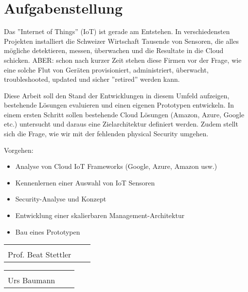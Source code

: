 \chapter*{Aufgabenstellung}
Das ''Internet of Things'' (IoT) ist gerade am Entstehen. In verschiedensten Projekten installiert die Schweizer Wirtschaft Tausende von Sensoren, die alles mögliche detektieren, messen, überwachen und die Resultate in die Cloud schicken. ABER: schon nach kurzer Zeit stehen diese Firmen vor der Frage, wie eine solche Flut von Geräten provisioniert, administriert, überwacht, troubleshooted, updated und sicher ''retired'' werden kann. 

Diese Arbeit soll den Stand der Entwicklungen in diesem Umfeld aufzeigen, bestehende Lösungen evaluieren und einen eigenen Prototypen entwickeln. In einem ersten Schritt sollen bestehende Cloud Lösungen (Amazon, Azure, Google etc.) untersucht und daraus eine Zielarchitektur definiert werden. Zudem stellt sich die Frage, wie wir mit der fehlenden physical Security umgehen.

Vorgehen:
\begin{itemize}
\item Analyse von Cloud IoT Frameworks (Google, Azure, Amazon usw.)
\item Kennenlernen einer Auswahl von IoT Sensoren
\item Security-Analyse und Konzept
\item Entwicklung einer skalierbaren Management-Architektur
\item Bau eines Prototypen
\end{itemize}



\vspace{1,5 cm} 
\begin{tabular}{p{7cm}p{.5cm}l}
\dotfill \\
Prof. Beat Stettler
\end{tabular}%
\hfill 
\begin{tabular}{p{7cm}p{.5cm}l}
\dotfill \\ 
Urs Baumann
\end{tabular}